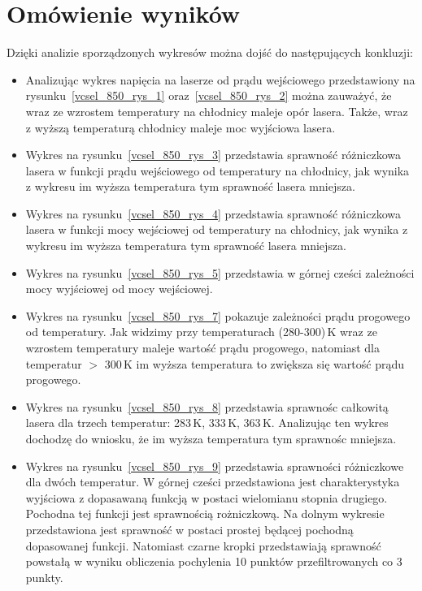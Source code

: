 \section{Omówienie wyników}
Dzięki analizie sporządzonych wykresów można dojść do następujących konkluzji:
\begin{itemize}
\item Analizując wykres napięcia na laserze od prądu wejściowego przedstawiony na rysunku~\ref{vcsel_850_rys_1} oraz~\ref{vcsel_850_rys_2} można zauważyć, że wraz ze wzrostem temperatury na chłodnicy
maleje opór lasera. Także, wraz z wyższą temperaturą chłodnicy maleje moc wyjściowa lasera.
\item Wykres na rysunku~\ref{vcsel_850_rys_3} przedstawia sprawność różniczkowa lasera w funkcji prądu wejściowego od temperatury na chłodnicy, jak wynika z wykresu im
wyższa temperatura tym sprawność lasera mniejsza.
\item Wykres na rysunku~\ref{vcsel_850_rys_4} przedstawia sprawność różniczkowa lasera w funkcji mocy wejściowej od temperatury na chłodnicy, jak wynika z wykresu im
wyższa temperatura tym sprawność lasera mniejsza.
\item Wykres na rysunku~\ref{vcsel_850_rys_5} przedstawia w górnej cześci zależności mocy wyjściowej od mocy wejściowej.
\item Wykres na rysunku~\ref{vcsel_850_rys_7} pokazuje zależności prądu progowego od temperatury. Jak widzimy przy temperaturach (280-300)\,K
wraz ze wzrostem temperatury maleje wartość prądu progowego, natomiast dla temperatur $>$ 300\,K im wyższa temperatura to zwiększa się
wartość prądu progowego.
\item Wykres na rysunku~\ref{vcsel_850_rys_8} przedstawia sprawnośc całkowitą lasera dla trzech temperatur: 283\,K, 333\,K, 363\,K. Analizując ten wykres
dochodzę do wniosku, że im wyższa temperatura tym sprawnośc mniejsza.
\item Wykres na rysunku~\ref{vcsel_850_rys_9} przedstawia sprawności różniczkowe dla dwóch temperatur. W górnej cześci przedstawiona jest charakterystyka
wyjściowa z dopasawaną funkcją w postaci wielomianu stopnia drugiego. Pochodna tej funkcji jest sprawnością rożniczkową. Na dolnym wykresie przedstawiona
jest sprawność w postaci prostej będącej pochodną dopasowanej funkcji. Natomiast czarne kropki przedstawiają sprawność powstałą w wyniku obliczenia pochylenia
10 punktów przefiltrowanych co 3 punkty.
\end{itemize}
